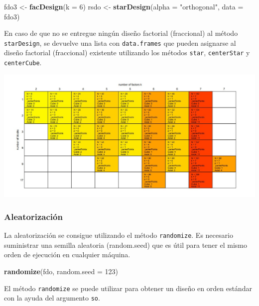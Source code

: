 \documentclass[
]{book}
\newenvironment{Shaded}{\begin{snugshade}}{\end{snugshade}}
\newcommand{\AttributeTok}[1]{\textcolor[rgb]{0.13,0.29,0.53}{#1}}
\newcommand{\DecValTok}[1]{\textcolor[rgb]{0.00,0.00,0.81}{#1}}
\newcommand{\FunctionTok}[1]{\textcolor[rgb]{0.13,0.29,0.53}{\textbf{#1}}}
\newcommand{\NormalTok}[1]{#1}
\newcommand{\OtherTok}[1]{\textcolor[rgb]{0.56,0.35,0.01}{#1}}
\newcommand{\StringTok}[1]{\textcolor[rgb]{0.31,0.60,0.02}{#1}}
\begin{document}
\begin{Shaded}
\begin{Highlighting}[]
\NormalTok{fdo3 }\OtherTok{\textless{}{-}} \FunctionTok{facDesign}\NormalTok{(}\AttributeTok{k =} \DecValTok{6}\NormalTok{)}
\NormalTok{rsdo }\OtherTok{\textless{}{-}} \FunctionTok{starDesign}\NormalTok{(}\AttributeTok{alpha =} \StringTok{"orthogonal"}\NormalTok{, }\AttributeTok{data =}\NormalTok{ fdo3)}
\end{Highlighting}
\end{Shaded}

En caso de que no se entregue ningún diseño factorial (fraccional) al método \texttt{starDesign}, se devuelve una lista con \texttt{data.frames} que pueden asignarse al diseño factorial (fraccional) existente utilizando los métodos \texttt{star}, \texttt{centerStar} y \texttt{centerCube}.

\includegraphics[width=7.29167in,height=\textheight]{graficos/dario3.jpg}

\hypertarget{aleatorizaciuxf3n}{%
\subsubsection{Aleatorización}\label{aleatorizaciuxf3n}}

La aleatorización se consigue utilizando el método \texttt{randomize}.
Es necesario suministrar una semilla aleatoria (random.seed) que es útil para tener el mismo orden de ejecución en cualquier máquina.

\begin{Shaded}
\begin{Highlighting}[]
\FunctionTok{randomize}\NormalTok{(fdo, }\AttributeTok{random.seed =} \DecValTok{123}\NormalTok{)}
\end{Highlighting}
\end{Shaded}

El método \texttt{randomize} se puede utilizar para obtener un diseño en orden estándar con la ayuda del argumento \texttt{so}.
\end{document}
